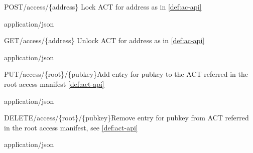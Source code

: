 
\begin{apiRoute}{POST}{/access/\{address\} }{Lock ACT for address as in \ref{def:ac-api}}
{
}
{ }

\begin{routeParameter} 
\end{routeParameter}
\begin{routeResponse}{application/json}
\end{routeResponse}
\end{apiRoute}



\begin{apiRoute}{GET}{/access/\{address\} }{Unlock ACT for address as in \ref{def:ac-api}}
{
}
{ }

\begin{routeParameter} 
\end{routeParameter}
\begin{routeResponse}{application/json}
\end{routeResponse}
\end{apiRoute}




\begin{apiRoute}{PUT}{/access/\{root\}/\{pubkey\}}{Add entry for pubkey to the  ACT referred in the root access manifest \ref{def:act-api}}
{
}
{ }

\begin{routeParameter} 
\end{routeParameter}
\begin{routeResponse}{application/json}
\end{routeResponse}
\end{apiRoute}


\begin{apiRoute}{DELETE}{/access/\{root\}/\{pubkey\}}{Remove entry for pubkey from ACT referred in the root access manifest, see \ref{def:act-api}}
{
}
{ }

\begin{routeParameter} 
\end{routeParameter}
\begin{routeResponse}{application/json}
\end{routeResponse}
\end{apiRoute}